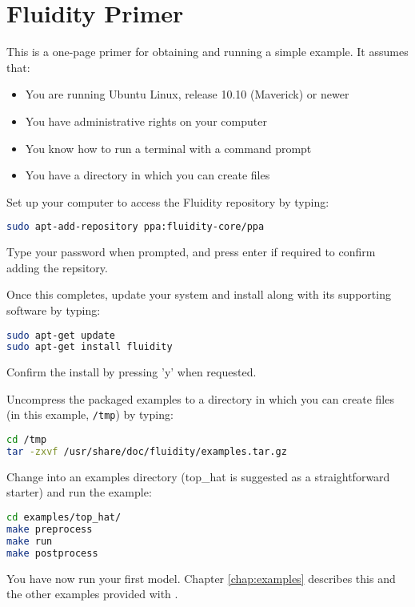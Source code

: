 \chapter*{Fluidity Primer}

This is a one-page primer for obtaining \fluidity and running a simple example. It assumes that:

\begin{itemize}
\item You are running Ubuntu Linux, release 10.10 (Maverick) or newer
\item You have administrative rights on your computer
\item You know how to run a terminal with a command prompt
\item You have a directory in which you can create files
\end{itemize}

Set up your computer to access the Fluidity repository by typing:

\begin{lstlisting}[language=Bash]
sudo apt-add-repository ppa:fluidity-core/ppa
\end{lstlisting}

Type your password when prompted, and press enter if required to confirm
adding the repsitory.

Once this completes, update your system and install \fluidity along with its
supporting software by typing:

\begin{lstlisting}[language=Bash]
sudo apt-get update
sudo apt-get install fluidity
\end{lstlisting}

Confirm the install by pressing 'y' when requested.

Uncompress the packaged examples to a directory in which you can create files (in this example, \lstinline[language=Bash]+/tmp+) by typing:

\begin{lstlisting}[language=Bash]
cd /tmp
tar -zxvf /usr/share/doc/fluidity/examples.tar.gz
\end{lstlisting}

Change into an examples directory (top\_hat is suggested as a straightforward
starter) and run the example:

\begin{lstlisting}[language=Bash]
cd examples/top_hat/
make preprocess
make run
make postprocess
\end{lstlisting}

You have now run your first \fluidity model. Chapter \ref{chap:examples}
describes this and the other examples provided with \fluidity.  

